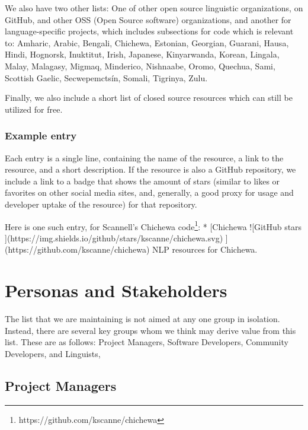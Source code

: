 \documentclass[10pt, a4paper]{article}
\begin{document}
We also have two other lists: One of other open source linguistic organizations, on GitHub, and other OSS (Open Source software) organizations, and another for language-specific projects, which includes subsections for code which is relevant to: Amharic, Arabic, Bengali, Chichewa, Estonian, Georgian, Guarani, Hausa, Hindi, Hognorsk, Inuktitut, Irish, Japanese, Kinyarwanda, Korean, Lingala, Malay, Malagasy, Migmaq, Minderico, Nishnaabe, Oromo, Quechua, Sami, Scottish Gaelic, Secwepemcts\'in, Somali, Tigrinya, Zulu.

Finally, we also include a short list of closed source resources which can still be utilized for free. 

\subsubsection{Example entry}

Each entry is a single line, containing the name of the resource, a link to the resource, and a short description. If the resource is also a GitHub repository, we include a link to a badge that shows the amount of stars (similar to likes or favorites on other social media sites, and, generally, a good proxy for usage and developer uptake of the resource) for that repository.

Here is one such entry, for Scannell's Chichewa code\footnote{https://github.com/kscanne/chichewa}: * [Chichewa ![GitHub stars ](https://img.shields.io/github/stars/kscanne/chichewa.svg) ](https://github.com/kscanne/chichewa)  NLP resources for Chichewa.

\section{Personas and Stakeholders}

The list that we are maintaining is not aimed at any one group in isolation. Instead, there are several key groups whom we think may derive value from this list. These are as follows: Project Managers, Software Developers, Community Developers, and  Linguists, 

\subsection{Project Managers}
\end{document}
